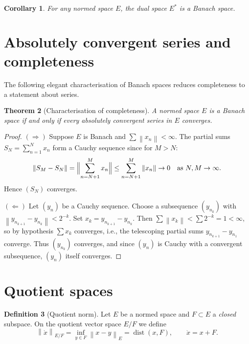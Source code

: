 \documentclass[a4paper,12pt]{book}
\DeclareMathOperator{\dist}{dist}
\newcommand{\norm}[1]{\left\| #1 \right\|}
\theoremstyle{definition}
\newtheorem{definition}{Definition}[chapter]
\theoremstyle{plain}
\newtheorem{theorem}[definition]{Theorem}
\newtheorem{corollary}[definition]{Corollary}
\theoremstyle{remark}
\begin{document}
\begin{corollary}
\label{cor:dual-banach}
For any normed space $E$, the dual space $E^*$ is a Banach space.
\end{corollary}

\section{Absolutely convergent series and completeness}
\label{sec:abs-conv}

The following elegant characterisation of Banach spaces reduces
completeness to a statement about series.

\begin{theorem}[Characterisation of completeness]
\label{thm:abs-conv-characterization}
A normed space $E$ is a Banach space if and only if every absolutely
convergent series in $E$ converges.
\end{theorem}

\begin{proof}
$(\Rightarrow)$  Suppose $E$ is Banach and $\sum\norm{x_n}<\infty$.
The partial sums $S_N=\sum_{n=1}^N x_n$ form a Cauchy sequence since
for $M>N$:
\[
  \norm{S_M-S_N} = \Bigl\|\sum_{n=N+1}^M x_n\Bigr\|
  \le \sum_{n=N+1}^M\norm{x_n} \to 0 \quad\text{as }N,M\to\infty.
\]
Hence $(S_N)$ converges.

$(\Leftarrow)$  Let $(y_n)$ be a Cauchy sequence.  Choose a subsequence
$(y_{n_k})$ with $\norm{y_{n_{k+1}}-y_{n_k}}<2^{-k}$.  Set
$x_k = y_{n_{k+1}}-y_{n_k}$.  Then $\sum\norm{x_k}<\sum 2^{-k}=1<\infty$,
so by hypothesis $\sum x_k$ converges, i.e., the telescoping partial sums
$y_{n_{k+1}}-y_{n_1}$ converge.  Thus $(y_{n_k})$ converges, and since
$(y_n)$ is Cauchy with a convergent subsequence, $(y_n)$ itself converges.
\end{proof}

\section{Quotient spaces}
\label{sec:quotient}

\begin{definition}[Quotient norm]
\label{def:quotient-norm}
Let $E$ be a normed space and $F\subset E$ a \emph{closed} subspace.
On the quotient vector space $E/F$ we define
\[
  \norm{\dot{x}}_{E/F} = \inf_{y\in F}\norm{x-y}_E
  = \dist(x,F),
  \qquad \dot{x} = x+F.
\]
\end{definition}
\end{document}

